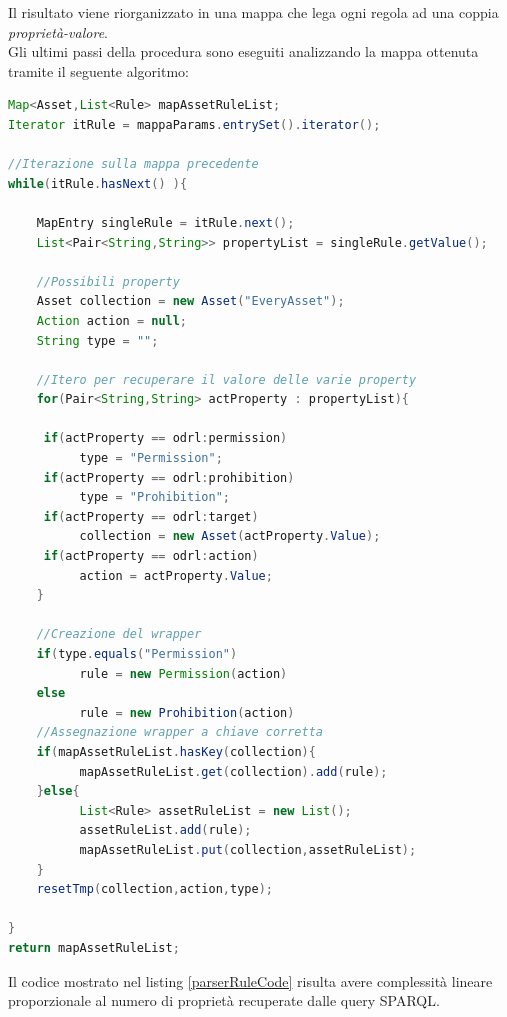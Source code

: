 \documentclass[12pt,a4paper,twoside]{book}
\begin{document}
Il risultato viene riorganizzato in una mappa che lega ogni regola ad una coppia \textit{proprietà-valore}.\\
Gli ultimi passi della procedura sono eseguiti analizzando la mappa ottenuta tramite il seguente algoritmo:
\begin{lstlisting}[language=java,firstnumber=1,caption={Pseudo codice per il popolamento della mappa finale},captionpos=b,label=parserRuleCode]
Map<Asset,List<Rule> mapAssetRuleList;
Iterator itRule = mappaParams.entrySet().iterator();

//Iterazione sulla mappa precedente
while(itRule.hasNext() ){

    MapEntry singleRule = itRule.next();
    List<Pair<String,String>> propertyList = singleRule.getValue();
    
    //Possibili property
    Asset collection = new Asset("EveryAsset");
    Action action = null;
    String type = "";
    
    //Itero per recuperare il valore delle varie property
	for(Pair<String,String> actProperty : propertyList){

	 if(actProperty == odrl:permission)
          type = "Permission";
	 if(actProperty == odrl:prohibition)
          type = "Prohibition";
	 if(actProperty == odrl:target)
          collection = new Asset(actProperty.Value);
	 if(actProperty == odrl:action)
	      action = actProperty.Value;
	}
	
    //Creazione del wrapper
    if(type.equals("Permission")
          rule = new Permission(action)
    else
          rule = new Prohibition(action)
    //Assegnazione wrapper a chiave corretta
    if(mapAssetRuleList.hasKey(collection){
          mapAssetRuleList.get(collection).add(rule);     
    }else{
          List<Rule> assetRuleList = new List();
          assetRuleList.add(rule);
          mapAssetRuleList.put(collection,assetRuleList);
    }
    resetTmp(collection,action,type);

}
return mapAssetRuleList;
\end{lstlisting}
Il codice mostrato nel listing \ref{parserRuleCode} risulta avere complessità lineare proporzionale al numero di proprietà recuperate dalle query SPARQL.
\end{document}
